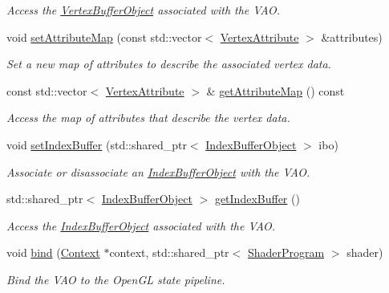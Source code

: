 \begin{DoxyCompactItemize}
\begin{DoxyCompactList}\small\item\em Access the \hyperlink{class_vertex_buffer_object}{Vertex\+Buffer\+Object} associated with the V\+AO. \end{DoxyCompactList}\item 
void \hyperlink{class_vertex_array_object_aafc38c6ce0a65051996a3eaadb2febcc}{set\+Attribute\+Map} (const std\+::vector$<$ \hyperlink{class_vertex_attribute}{Vertex\+Attribute} $>$ \&attributes)
\begin{DoxyCompactList}\small\item\em Set a new map of attributes to describe the associated vertex data. \end{DoxyCompactList}\item 
const std\+::vector$<$ \hyperlink{class_vertex_attribute}{Vertex\+Attribute} $>$ \& \hyperlink{class_vertex_array_object_a91c81009eb2ab054c57a7053b974421b}{get\+Attribute\+Map} () const 
\begin{DoxyCompactList}\small\item\em Access the map of attributes that describe the vertex data. \end{DoxyCompactList}\item 
void \hyperlink{class_vertex_array_object_a074da4a3d5d45cc4935458b1e5441d61}{set\+Index\+Buffer} (std\+::shared\+\_\+ptr$<$ \hyperlink{class_index_buffer_object}{Index\+Buffer\+Object} $>$ ibo)
\begin{DoxyCompactList}\small\item\em Associate or disassociate an \hyperlink{class_index_buffer_object}{Index\+Buffer\+Object} with the V\+AO. \end{DoxyCompactList}\item 
std\+::shared\+\_\+ptr$<$ \hyperlink{class_index_buffer_object}{Index\+Buffer\+Object} $>$ \hyperlink{class_vertex_array_object_ab1b5d2c13e89a77ff2da97dc3a072ec4}{get\+Index\+Buffer} ()
\begin{DoxyCompactList}\small\item\em Access the \hyperlink{class_index_buffer_object}{Index\+Buffer\+Object} associated with the V\+AO. \end{DoxyCompactList}\item 
void \hyperlink{class_vertex_array_object_a9228fcd314372296db91b65c792f412c}{bind} (\hyperlink{class_context}{Context} $\ast$context, std\+::shared\+\_\+ptr$<$ \hyperlink{class_shader_program}{Shader\+Program} $>$ shader)
\begin{DoxyCompactList}\small\item\em Bind the V\+AO to the Open\+GL state pipeline. \end{DoxyCompactList}\end{DoxyCompactItemize}
